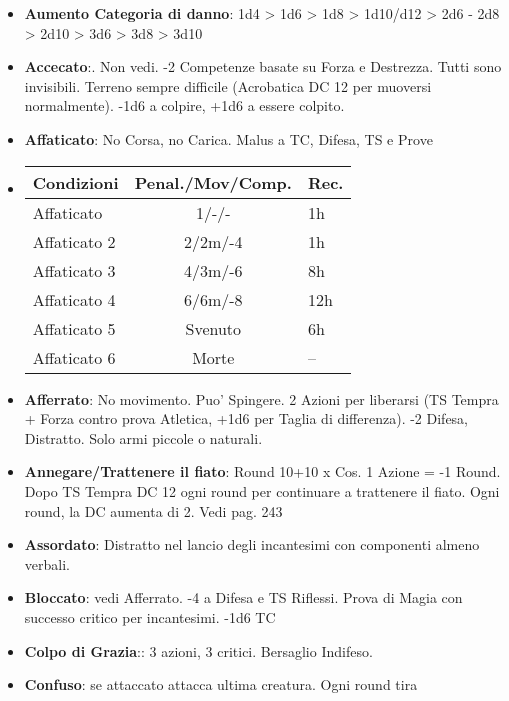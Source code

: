 \documentclass[landscape,10pt,a4paper]{article}
\begin{document}
\pagestyle{empty}



\begin{multicols}{3}

\footnotesize

\begin{dmbox}[title=Condizioni - pagina \pageref{condizioni}]

\begin{itemize}[leftmargin=0.5cm,itemsep=-1pt,parsep=0pt]
\item \textbf{Aumento Categoria di danno}: 1d4 > 1d6 > 1d8 > 1d10/d12 > 2d6 - 2d8 > 2d10 > 3d6 > 3d8 > 3d10
\item \textbf{Accecato}:. Non vedi. -2  Competenze basate su Forza e Destrezza. Tutti sono invisibili. Terreno sempre difficile (Acrobatica DC 12 per muoversi normalmente). -1d6 a colpire, +1d6 a essere colpito.
\item \textbf{Affaticato}: No Corsa, no Carica. Malus a TC, Difesa, TS e Prove
\item
\begin{tabular}{lcl}
\textbf{Condizioni}& \textbf{Penal./Mov/Comp.}&\textbf{Rec.}\\
\hline
Affaticato  &1/-/-&1h\\
Affaticato 2&2/2m/-4&1h\\
Affaticato 3&4/3m/-6&8h\\
Affaticato 4&6/6m/-8&12h\\
Affaticato 5&Svenuto&6h\\
Affaticato 6&Morte&--
\end{tabular}
\item \textbf{Afferrato}: No movimento. Puo' Spingere. 2 Azioni per liberarsi (TS Tempra + Forza contro prova Atletica, +1d6 per Taglia di differenza). -2 Difesa, Distratto. Solo armi piccole o naturali.
\item \textbf{Annegare/Trattenere il fiato}: Round 10+10 x Cos. 1 Azione = -1 Round. Dopo TS Tempra DC 12 ogni round per continuare a trattenere il fiato. Ogni round, la DC aumenta di 2. Vedi pag. 243
\item \textbf{Assordato}: Distratto nel lancio degli incantesimi con componenti almeno verbali.
\item \textbf{Bloccato}: vedi Afferrato. -4 a Difesa e TS Riflessi. Prova di Magia con successo critico per incantesimi. -1d6 TC
\item \textbf{Colpo di Grazia}:: 3 azioni, 3 critici. Bersaglio Indifeso.
\item \textbf{Confuso}: se attaccato attacca ultima creatura. Ogni round tira


\end{itemize}
\end{dmbox}
\end{multicols}
\end{document}
